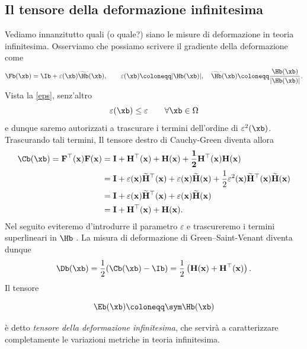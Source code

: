 \subsection{Il tensore della deformazione infinitesima}
Vediamo innanzitutto quali (o quale?) siano le misure di deformazione in teoria infinitesima. Osserviamo  che possiamo scrivere il gradiente della deformazione come
\begin{equation}
\Fb(\xb)=\Ib +\varepsilon(\xb) \widetilde{\Hb}(\xb), \qquad \varepsilon(\xb)\coloneqq |\Hb(\xb)|, \quad \widetilde{\Hb}(\xb)\coloneqq \frac{\Hb(\xb)}{|\Hb(\xb)|}.
\end{equation}
Vista la \eqref{eps}, senz'altro
\begin{equation}
\varepsilon(\xb)\leq \varepsilon \qquad \forall \xb\in \Omega
\end{equation}
e dunque saremo autorizzati a trascurare i termini dell'ordine di $\varepsilon^2(\xb)$. Trascurando tali termini, Il tensore destro di Cauchy-Green diventa allora
\begin{equation}\label{Cap}
	\begin{aligned}
	\Cb(\xb)=	\mathbf{F}^\top(\mathbf{x})\mathbf{F}(\mathbf{x})& =\mathbf{I+H^\top(x)+H(x)+\frac12H^\top(x)H(x)}  \\
		&=\mathbf{I}+\varepsilon(\mathbf{x})\widetilde{\mathbf{H}}^\top(\mathbf{x})+\varepsilon(\mathbf{x})\widetilde{\mathbf{H}}(\mathbf{x})+\frac12\varepsilon^2(\mathbf{x})\widetilde{\mathbf{H}}^\top(\mathbf{x})\widetilde{\mathbf{H}}(\mathbf{x}) \\
		&=\mathbf{I}+\varepsilon(\mathbf{x})\widetilde{\mathbf{H}}^\top(\mathbf{x})+\varepsilon(\mathbf{x})\widetilde{\mathbf{H}}(\mathbf{x}) \\
		&=\mathbf{I+H^\top(x)+H(x)}.
	\end{aligned}
\end{equation}
Nel seguito eviteremo d’introdurre il parametro $\varepsilon$ e trascureremo i termini
superlineari in $\Hb$
.
La misura di deformazione di Green--Saint-Venant diventa dunque
\begin{equation}
\Db(\xb)=\frac{1}{2}(\Cb(\xb)-\Ib)=\frac{1}{2}\left(\mathbf{H(x)+H^\top(x)}\right).
\end{equation}
Il tensore 
\begin{definition}
	\begin{equation}\label{simgrad}
	\Eb(\xb)\coloneqq\sym \Hb(\xb)
\end{equation}
\end{definition}
è detto \textit{tensore della deformazione infinitesima}, che servirà a caratterizzare completamente le variazioni metriche in teoria infinitesima.

